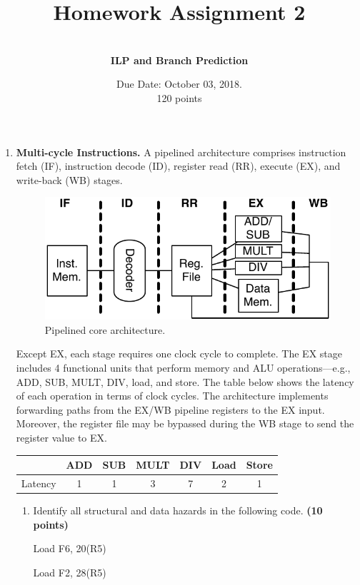 \documentclass[a4paper, 11pt]{exam}
\title{Homework Assignment 2}
\subtitle{CS/ECE 6810: Computer Architecture \\
September 26,2018
\\
Name: Jake Pitkin

UID: u0891770 }
\author{ \\
\textbf{ILP and Branch Prediction}}
\date{Due Date: October 03, 2018.\\
120 points}
\begin{document}
\maketitle
\begin{center}

\begin{enumerate}
	
\item \textbf{Multi-cycle Instructions.}
A pipelined architecture comprises instruction fetch (IF), instruction decode (ID), register read (RR), execute (EX), and write-back (WB) stages.
\begin{figure}[!h]
	\centering
	\includegraphics[width=0.5\linewidth]{q1}
	\caption{Pipelined core architecture.}
	\label{fig:q1}
\end{figure}

Except EX, each stage requires one clock cycle to complete.
The EX stage includes 4 functional units that perform memory and ALU operations---e.g., ADD, SUB, MULT, DIV, load, and store.
The table below shows the latency of each operation in terms of clock cycles.
The architecture implements forwarding paths from the EX/WB pipeline registers to the EX input.
Moreover, the register file may be bypassed during the WB stage to send the register value to EX.

\begin{center}
\begin{tabular}{ |c|c|c|c|c|c|c| } 
 \hline
  & ADD & SUB & MULT & DIV & Load & Store \\ 
  \hline
 Latency & 1 & 1 & 3 & 7 & 2 & 1 \\ 
 \hline
\end{tabular}
\end{center}

\begin{enumerate}
\item Identify all structural and data hazards in the following code. \textbf {(10 points)}


\begin {center}
Load F6, 20(R5) 

Load F2, 28(R5)


\end{center}
\end{enumerate}
\end{enumerate}
\end{center}
\end{document}
